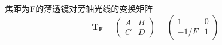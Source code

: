 \documentclass[14pt,a4paper,oneside]{article}
\numberwithin{equation}{subsection}             %
\numberwithin{figure}{subsection}               %
\begin{document}
焦距为F的薄透镜对旁轴光线的变换矩阵
\begin{equation}
    \mathbf{T_F}=\begin{pmatrix}
        A&B\\
        C&D
    \end{pmatrix}=\begin{pmatrix}
        1&0\\
        -1/F&1
    \end{pmatrix}
    \label{eq:A.11}
\end{equation}








\newpage

\clearpage           %
{}      %
{}   %


\end{document}
